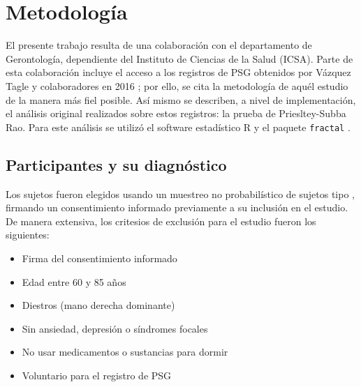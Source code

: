 \documentclass[12pt,a4paper]{mitthesis}
\begin{document}

\chapter{Metodolog\'ia}

El presente trabajo resulta de una colaboraci\'on con el departamento de Gerontolog\'ia, 
dependiente del Instituto de Ciencias de la Salud (ICSA).
Parte de esta colaboraci\'on incluye el acceso a los registros de PSG obtenidos por V\'azquez Tagle 
y colaboradores en 2016 \cite{VazquezTagle16}; por ello, se cita la metodolog\'ia de aqu\'el 
estudio de la manera m\'as fiel posible.
As\'i mismo se describen, a nivel de implementaci\'on, el an\'alisis original realizados sobre 
estos registros: la prueba de Priesltey-Subba Rao. 
Para este an\'alisis se utiliz\'o el software estad\'istico R\cite{R_citar} y 
el paquete \texttt{fractal} \cite{R_fractal}.


\section{Participantes y su diagn\'ostico}

Los sujetos fueron elegidos usando un muestreo no probabilístico de sujetos tipo \cite{Garcia09},
firmando un consentimiento informado previamente a su inclusi\'on en el estudio. 
De manera extensiva, los critesios de exclusi\'on para el estudio fueron los siguientes:
\begin{itemize}
\item Firma del consentimiento informado
\item Edad entre 60 y 85 a\~nos
\item Diestros (mano derecha dominante)
\item Sin ansiedad, depresi\'on o s\'indromes focales
\item No usar medicamentos o sustancias para dormir
\item Voluntario para el registro de PSG
\end{itemize}
\end{document}

